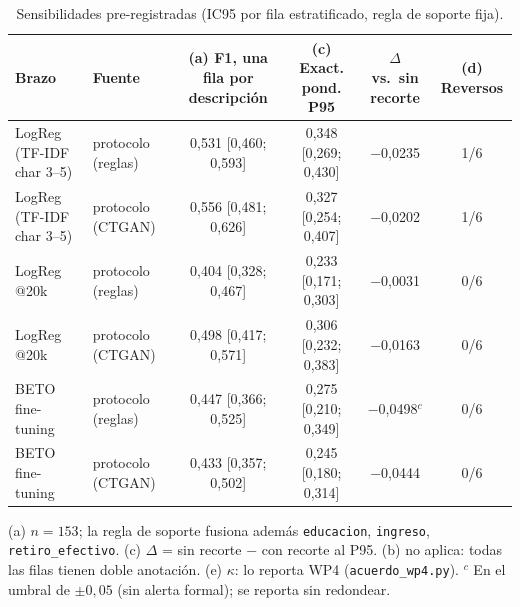 \begin{table}[ht]\centering\small
\caption{Sensibilidades pre-registradas (IC95 por fila estratificado, regla de soporte fija).}
\label{tab:sensibilidades}
\begin{tabular}{llcccc}
\toprule
Brazo & Fuente & (a) F1, una fila por descripción & (c) Exact. pond. P95 & $\Delta$ vs.\ sin recorte & (d) Reversos \\
\midrule
LogReg (TF-IDF char 3--5) & protocolo (reglas) & 0{,}531 [0{,}460; 0{,}593] & 0{,}348 [0{,}269; 0{,}430] & $-$0{,}0235 & 1/6 \\
LogReg (TF-IDF char 3--5) & protocolo (CTGAN) & 0{,}556 [0{,}481; 0{,}626] & 0{,}327 [0{,}254; 0{,}407] & $-$0{,}0202 & 1/6 \\
LogReg @20k & protocolo (reglas) & 0{,}404 [0{,}328; 0{,}467] & 0{,}233 [0{,}171; 0{,}303] & $-$0{,}0031 & 0/6 \\
LogReg @20k & protocolo (CTGAN) & 0{,}498 [0{,}417; 0{,}571] & 0{,}306 [0{,}232; 0{,}383] & $-$0{,}0163 & 0/6 \\
BETO fine-tuning & protocolo (reglas) & 0{,}447 [0{,}366; 0{,}525] & 0{,}275 [0{,}210; 0{,}349] & $-$0{,}0498$^{c}$ & 0/6 \\
BETO fine-tuning & protocolo (CTGAN) & 0{,}433 [0{,}357; 0{,}502] & 0{,}245 [0{,}180; 0{,}314] & $-$0{,}0444 & 0/6 \\
\bottomrule
\end{tabular}
\par\footnotesize (a) $n=153$; la regla de soporte fusiona además \texttt{educacion}, \texttt{ingreso}, \texttt{retiro\_efectivo}. (c) $\Delta$ = sin recorte $-$ con recorte al P95. (b) no aplica: todas las filas tienen doble anotación. (e) $\kappa$: lo reporta WP4 (\texttt{acuerdo\_wp4.py}). $^{c}$ En el umbral de $\pm 0{,}05$ (sin alerta formal); se reporta sin redondear.
\end{table}
